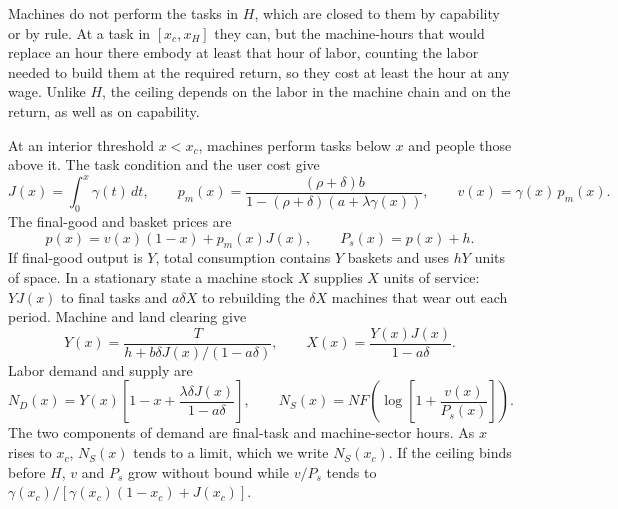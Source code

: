 \documentclass[12pt]{article}
\theoremstyle{plain}
\theoremstyle{definition}
\theoremstyle{remark}
\begin{document}
Machines do not perform the tasks in $H$, which are closed to them by capability or by rule. At a task in $[x_c,x_H]$ they can, but the machine-hours that would replace an hour there embody at least that hour of labor, counting the labor needed to build them at the required return, so they cost at least the hour at any wage. Unlike $H$, the ceiling depends on the labor in the machine chain and on the return, as well as on capability.

At an interior threshold $x<x_c$, machines perform tasks below $x$ and people those above it. The task condition and the user cost give
\begin{equation}\label{eq:21}
J(x)=\int_0^x\gamma(t)\,dt,\qquad
p_m(x)=\frac{(\rho+\delta)b}{1-(\rho+\delta)(a+\lambda\gamma(x))},\qquad
v(x)=\gamma(x)\,p_m(x).
\end{equation}
The final-good and basket prices are
\begin{equation}\label{eq:22}
p(x)=v(x)(1-x)+p_m(x)J(x),\qquad
P_s(x)=p(x)+h.
\end{equation}
If final-good output is $Y$, total consumption contains $Y$ baskets and uses $hY$ units of space. In a stationary state a machine stock $X$ supplies $X$ units of service: $YJ(x)$ to final tasks and $a\delta X$ to rebuilding the $\delta X$ machines that wear out each period. Machine and land clearing give
\begin{equation}\label{eq:23}
Y(x)=\frac{T}{h+b\delta J(x)/(1-a\delta)},\qquad
X(x)=\frac{Y(x)J(x)}{1-a\delta}.
\end{equation}
Labor demand and supply are
\begin{equation}\label{eq:24}
N_D(x)=Y(x)\left[1-x+\frac{\lambda\delta J(x)}{1-a\delta}\right],\qquad
N_S(x)=NF\left(\log\left[1+\frac{v(x)}{P_s(x)}\right]\right).
\end{equation}
The two components of demand are final-task and machine-sector hours. As $x$ rises to $x_c$, $N_S(x)$ tends to a limit, which we write $N_S(x_c)$. If the ceiling binds before $H$, $v$ and $P_s$ grow without bound while $v/P_s$ tends to $\gamma(x_c)/[\gamma(x_c)(1-x_c)+J(x_c)]$.
\end{document}
